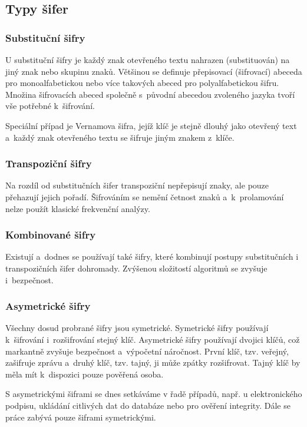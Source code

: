 \documentclass[glossaries, index]{kidiplom}
\begin{document}
\subsection{Typy šifer}
\subsubsection{Substituční šifry}
U substituční šifry je každý znak otevřeného textu nahrazen (substituován) na jiný znak nebo skupinu znaků. Většinou se definuje přepisovací (šifrovací) abeceda pro monoalfabetickou nebo více takových abeced pro polyalfabetickou šifru. Množina šifrovacích abeced společně s~původní abecedou zvoleného jazyka tvoří vše potřebné k~šifrování. 

Speciální případ je Vernamova šifra, jejíž klíč je stejně dlouhý jako otevřený text a~každý znak otevřeného textu se šifruje jiným znakem z~klíče.

\subsubsection{Transpoziční šifry}
Na rozdíl od substitučních šifer transpoziční nepřepisují znaky, ale pouze přehazují jejich pořadí. Šifrováním se nemění četnost znaků a~k~prolamování nelze použít klasické frekvenční analýzy. 

\subsubsection{Kombinované šifry}
Existují a~dodnes se používají také šifry, které kombinují postupy substitučních i transpozičních šifer dohromady. Zvýšenou složitostí algoritmů se zvyšuje i~bezpečnost. 

\subsubsection{Asymetrické šifry}
Všechny dosud probrané šifry jsou symetrické. Symetrické šifry používají k~šifrování i~rozšifrování stejný klíč. Asymetrické šifry používají dvojici klíčů, což markantně zvyšuje bezpečnost a~výpočetní náročnost. První klíč, tzv. veřejný, zašifruje zprávu a~druhý klíč, tzv. tajný, ji může zpátky rozšifrovat. Tajný klíč by měla mít k~dispozici pouze pověřená osoba.

S asymetrickými šiframi se dnes setkáváme v řadě případů, např. u elektronického podpisu, ukládání citlivých dat do databáze nebo pro ověření integrity. Dále se práce zabývá pouze šiframi symetrickými.
\end{document}
